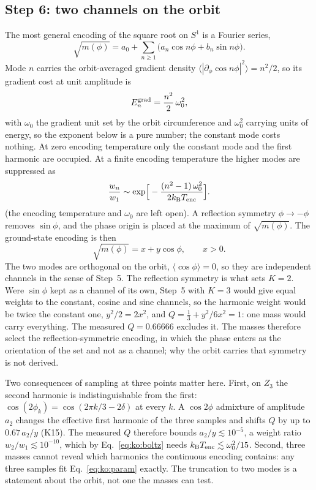 \subsection{Step 6: two channels on the orbit}
The most general encoding of the square root on $S^1$ is a Fourier series,
\begin{equation}
\sqrt{m(\phi)}=a_0+\sum_{n\ge1}\big(a_n\cos n\phi+b_n\sin n\phi\big).\label{eq:ko:fourier}
\end{equation}
Mode $n$ carries the orbit-averaged gradient density $\langle|\partial_\phi\cos n\phi|^2\rangle=n^2/2$, so its gradient cost at unit amplitude is
\begin{equation}
E^{\rm grad}_n=\frac{n^2}{2}\,\omega_0^2,\label{eq:ko:grad}
\end{equation}
with $\omega_0$ the gradient unit set by the orbit circumference and $\omega_0^2$ carrying units of energy, so the exponent below is a pure number; the constant mode costs nothing. \derived{} At zero encoding temperature only the
constant mode and the first harmonic are occupied. At a finite encoding temperature the higher modes are suppressed as
\begin{equation}
\frac{w_n}{w_1}\sim\exp\!\Big[-\frac{(n^2-1)\,\omega_0^2}{2k_{\mathrm B} T_{\rm enc}}\Big].\label{eq:ko:boltz}
\end{equation}
\conjecture{} (the encoding temperature and $\omega_0$ are left open). A reflection symmetry $\phi\to-\phi$ removes $\sin\phi$, and the phase
origin is placed at the maximum of $\sqrt{m(\phi)}$. The ground-state encoding is then
\begin{equation}
\sqrt{m(\phi)}=x+y\cos\phi,\qquad x>0.\label{eq:ko:two}
\end{equation}
\conjecture{} The two modes are orthogonal on the orbit, $\langle\cos\phi\rangle=0$, so they are independent channels in the sense of Step~5.
\derived
The reflection symmetry is what sets $K=2$. Were $\sin\phi$ kept as a channel of its own, Step~5 with $K=3$ would give equal weights to
the constant, cosine and sine channels, so the harmonic weight would be twice the constant one, $y^2/2=2x^2$, and
$Q=\tfrac13+y^2/6x^2=1$: one mass would carry everything. The measured $Q=0.66666$ excludes it. \calc{} The masses therefore select the
reflection-symmetric encoding, in which the phase enters as the orientation of the set and not as a channel; why the orbit carries that
symmetry is not derived. \conjecture

Two consequences of sampling at three points matter here. First, on $Z_3$ the second harmonic is indistinguishable from the first:
$\cos(2\phi_k)=\cos(2\pi k/3-2\delta)$ at every $k$. A $\cos2\phi$ admixture of amplitude $a_2$ changes the effective first harmonic of the three
samples and shifts $Q$ by up to $0.67\,a_2/y$ (K15). \calc{} The measured $Q$ therefore bounds $a_2/y\lesssim10^{-5}$, a weight ratio
$w_2/w_1\lesssim10^{-10}$, which by Eq.~\eqref{eq:ko:boltz} needs $k_{\mathrm B} T_{\rm enc}\lesssim\omega_0^2/15$. \calc{} Second, three masses cannot
reveal which harmonics the continuous encoding contains: any three samples fit Eq.~\eqref{eq:ko:param} exactly. The truncation to two modes is a
statement about the orbit, not one the masses can test. \derived

